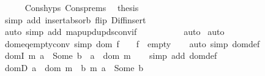 \begin{isabellebody}
\ \ \ \ \isamarkupfalse%
\ Cons{\isachardot}{\kern0pt}hyps\ Cons{\isachardot}{\kern0pt}prems\ \isamarkupfalse%
\ {\isacharquery}{\kern0pt}thesis\isanewline
\ \ \ \ \ \ \isamarkupfalse%
\ {\isacharparenleft}{\kern0pt}simp\ add{\isacharcolon}{\kern0pt}\ insert{\isacharunderscore}{\kern0pt}absorb\ flip{\isacharcolon}{\kern0pt}\ Diff{\isacharunderscore}{\kern0pt}insert{\isacharparenright}{\kern0pt}\isanewline
\ \ \ \ \ \ \isamarkupfalse%
\ {\isacharparenleft}{\kern0pt}auto\ simp\ add{\isacharcolon}{\kern0pt}\ map{\isacharunderscore}{\kern0pt}upd{\isacharunderscore}{\kern0pt}upds{\isacharunderscore}{\kern0pt}conv{\isacharunderscore}{\kern0pt}if{\isacharparenright}{\kern0pt}\isanewline
\ \ \ \ \ \ \isamarkupfalse%
\isanewline
\ \ \isamarkupfalse%
\ auto\isanewline
{}\isamarkupfalse%
\ auto%
\endisatagproof
{\isafoldproof}%
%
\isadelimproof
%
\endisadelimproof
%
\isadelimdocument
%
\endisadelimdocument
%
\isatagdocument
%
\isamarkuptrue%
%
\endisatagdocument
{\isafolddocument}%
%
\isadelimdocument
%
\endisadelimdocument
{}\isamarkupfalse%
\ dom{\isacharunderscore}{\kern0pt}eq{\isacharunderscore}{\kern0pt}empty{\isacharunderscore}{\kern0pt}conv\ {\isacharbrackleft}{\kern0pt}simp{\isacharbrackright}{\kern0pt}{\isacharcolon}{\kern0pt}\ {\isachardoublequoteopen}dom\ f\ {\isacharequal}{\kern0pt}\ {\isacharbraceleft}{\kern0pt}{\isacharbraceright}{\kern0pt}\ {\isasymlongleftrightarrow}\ f\ {\isacharequal}{\kern0pt}\ empty{\isachardoublequoteclose}\isanewline
%
\isadelimproof
\ \ %
\endisadelimproof
%
\isatagproof
{}\isamarkupfalse%
\ {\isacharparenleft}{\kern0pt}auto\ simp{\isacharcolon}{\kern0pt}\ dom{\isacharunderscore}{\kern0pt}def{\isacharparenright}{\kern0pt}%
\endisatagproof
{\isafoldproof}%
%
\isadelimproof
\isanewline
%
\endisadelimproof
\isanewline
{}\isamarkupfalse%
\ domI{\isacharcolon}{\kern0pt}\ {\isachardoublequoteopen}m\ a\ {\isacharequal}{\kern0pt}\ Some\ b\ {\isasymLongrightarrow}\ a\ {\isasymin}\ dom\ m{\isachardoublequoteclose}\isanewline
%
\isadelimproof
\ \ %
\endisadelimproof
%
\isatagproof
{}\isamarkupfalse%
\ {\isacharparenleft}{\kern0pt}simp\ add{\isacharcolon}{\kern0pt}\ dom{\isacharunderscore}{\kern0pt}def{\isacharparenright}{\kern0pt}%
\endisatagproof
{\isafoldproof}%
%
\isadelimproof
\isanewline
%
\endisadelimproof
\isanewline
\isanewline
{}\isamarkupfalse%
\ domD{\isacharcolon}{\kern0pt}\ {\isachardoublequoteopen}a\ {\isasymin}\ dom\ m\ {\isasymLongrightarrow}\ {\isasymexists}b{\isachardot}{\kern0pt}\ m\ a\ {\isacharequal}{\kern0pt}\ Some\ b{\isachardoublequoteclose}\isanewline

\end{isabellebody}
